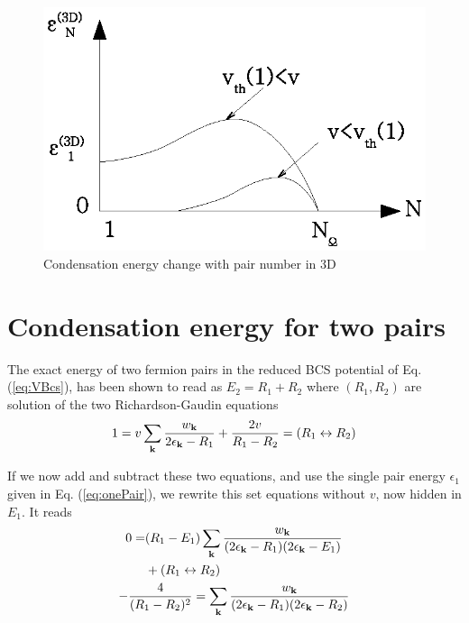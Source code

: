 \documentclass[aps,prb,showpacs,3p,twocolumn]{elsarticle}
\begin{document}
\begin{figure}[htb]
	\centering
		\includegraphics[width=0.8\columnwidth]{3dCondChange.eps}
	\caption{Condensation energy change with pair number  in 3D}
	\label{fig:3dCondChange}
\end{figure}

\section{Condensation energy for two pairs\label{sec:twoPair}}
The exact energy of two fermion pairs in the reduced BCS potential of Eq. (\ref{eq:VBcs}), has been shown to read as $E_2=R_1+R_2$ where $(R_1,R_2)$ are solution of the two Richardson-Gaudin equations
\begin{equation}
1=v\sum_{\mathbf{k}}\frac{w_{\mathbf{k}}}{2\epsilon_{\mathbf{k}}-R_1}+\frac{2v}{R_1-R_2}=(R_{1}\leftrightarrow{}R_{2})
\label{eq:richardsonEq}
\end{equation}

If we now add and subtract these two equations, and use the single pair energy $\epsilon_{1}$ given in  Eq. (\ref{eq:onePair}), we rewrite this set equations without $v$, now hidden in $E_{1}$.  It reads 
\begin{gather}
\begin{split}
0=&(R_1-E_1)\sum_{\mathbf{k}}\frac{w_{\mathbf{k}}}{(2\epsilon_{\mathbf{k}}-R_1)(2\epsilon_{\mathbf{k}}-E_1)}\\
&+(R_{1}\leftrightarrow{}R_{2})\label{eq:2PairPlus}
\end{split}\\
-\frac{4}{(R_1-R_2)^2}=\sum_{\mathbf{k}}\frac{w_{\mathbf{k}}}{(2\epsilon_{\mathbf{k}}-R_1)(2\epsilon_{\mathbf{k}}-R_2)}\label{eq:2PairMinus}
\end{gather}
\end{document}

